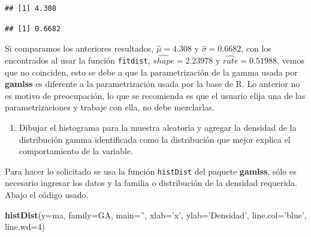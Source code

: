 \documentclass[10pt,]{krantz}
\makeatletter
\newenvironment{Shaded}{\begin{snugshade}}{\end{snugshade}}
\newcommand{\KeywordTok}[1]{\textcolor[rgb]{0.13,0.29,0.53}{\textbf{#1}}}
\newcommand{\DataTypeTok}[1]{\textcolor[rgb]{0.13,0.29,0.53}{#1}}
\newcommand{\DecValTok}[1]{\textcolor[rgb]{0.00,0.00,0.81}{#1}}
\newcommand{\StringTok}[1]{\textcolor[rgb]{0.31,0.60,0.02}{#1}}
\newcommand{\OperatorTok}[1]{\textcolor[rgb]{0.81,0.36,0.00}{\textbf{#1}}}
\newcommand{\NormalTok}[1]{#1}
\providecommand{\tightlist}{%
  \setlength{\itemsep}{0pt}\setlength{\parskip}{0pt}}
\let\proglang=\textsf
\newenvironment{kframe}{%
\medskip{}
\setlength{\fboxsep}{.8em}
 \def\at@end@of@kframe{}%
 \ifinner\ifhmode%
  \def\at@end@of@kframe{\end{minipage}}%
  \begin{minipage}{\columnwidth}%
 \fi\fi%
 \def\FrameCommand##1{\hskip\@totalleftmargin \hskip-\fboxsep
 \colorbox{shadecolor}{##1}\hskip-\fboxsep
     \hskip-\linewidth \hskip-\@totalleftmargin \hskip\columnwidth}%
 \MakeFramed {\advance\hsize-\width
   \@totalleftmargin\z@ \linewidth\hsize
   \@setminipage}}%
 {\par\unskip\endMakeFramed%
 \at@end@of@kframe}
\renewenvironment{Shaded}{\begin{kframe}}{\end{kframe}}
\makeatother
\begin{document}
\begin{Shaded}
\end{Shaded}

\begin{verbatim}
## [1] 4.308
\end{verbatim}

\begin{Shaded}
\end{Shaded}

\begin{verbatim}
## [1] 0.6682
\end{verbatim}

Si comparamos los anteriores resultados, \(\hat{\mu}= 4.308\) y
\(\hat{\sigma}=0.6682\), con los encontrados al usar la función
\texttt{fitdist}, \(\widehat{shape}=2.23978\) y
\(\widehat{rate}=0.51988\), vemos que no coinciden, esto se debe a que
la parametrización de la gamma usada por \textbf{gamlss} es diferente a
la parametrización usada por la base de \proglang{R}. Lo anterior no es
motivo de preocupación, lo que se recomienda es que el usuario elija una
de las parametrizaciones y trabaje con ella, no debe mezclarlas.

\begin{enumerate}
\def\labelenumi{\arabic{enumi})}
\setcounter{enumi}{2}
\tightlist
\item
  Dibujar el histograma para la muestra aleatoria y agregar la densidad
  de la distribución gamma identificada como la distribución que mejor
  explica el comportamiento de la variable.
\end{enumerate}

Para hacer lo solicitado se usa la función \texttt{histDist} del paquete
\textbf{gamlss}, sólo es necesario ingresar los datos y la familia o
distribución de la densidad requerida. Abajo el código usado.

\begin{Shaded}
\begin{Highlighting}[]
\KeywordTok{histDist}\NormalTok{(}\DataTypeTok{y=}\NormalTok{ma, }\DataTypeTok{family=}\NormalTok{GA, }\DataTypeTok{main=}\StringTok{''}\NormalTok{, }\DataTypeTok{xlab=}\StringTok{'x'}\NormalTok{, }\DataTypeTok{ylab=}\StringTok{'Densidad'}\NormalTok{,}
         \DataTypeTok{line.col=}\StringTok{'blue'}\NormalTok{, }\DataTypeTok{line.wd=}\DecValTok{4}\NormalTok{)}
\end{Highlighting}
\end{Shaded}
\end{document}

